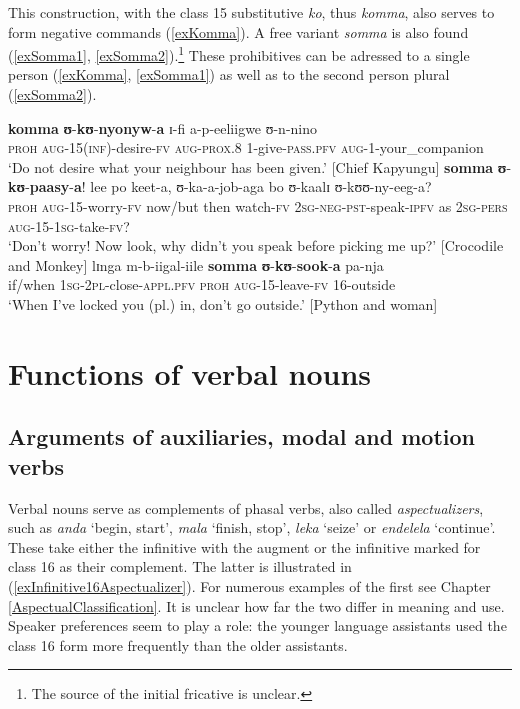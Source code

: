 This construction, with the class 15 substitutive \textit{ko}, thus \textit{komma}, also serves to form negative commands (\ref{exKomma}). A free variant \textit{somma} is also found (\ref{exSomma1}, \ref{exSomma2}).\footnote{The source of the initial fricative is unclear.} These prohibitives can be adressed to a single person (\ref{exKomma}, \ref{exSomma1}) as well as to the second person plural (\ref{exSomma2}).
\begin{exe}
\ex \label{exKomma}\gll \textbf{komma} \textbf{ʊ}-\textbf{kʊ}-\textbf{nyonyw}-\textbf{a} ɪ-fi a-p-eeliigwe ʊ-n-nino\\
\textsc{proh} \textsc{aug}-15(\textsc{inf})-desire-\textsc{fv} \textsc{aug}-\textsc{prox}.8 1-give-\textsc{pass}.\textsc{pfv} \textsc{aug}-1-your\_companion\\
\glt `Do not desire what your neighbour has been given.' [Chief Kapyungu]
\ex \label{exSomma1}
\gll \textbf{somma} \textbf{ʊ}-\textbf{kʊ}-\textbf{paasy}-\textbf{a}! lee po keet-a, ʊ-ka-a-job-aga bo ʊ-kaalɪ ʊ-kʊʊ-ny-eeg-a?\\
\textsc{proh} \textsc{aug}-15-worry-\textsc{fv} now/but then watch-\textsc{fv} \textsc{2sg}-\textsc{neg}-\textsc{pst}-speak-\textsc{ipfv} as \textsc{2sg}-\textsc{pers} \textsc{aug}-15-\textsc{1sg}-take-\textsc{fv}?\\
\glt \lq Don't worry! Now look, why didn't you speak before picking me up?' [Crocodile and Monkey]
\ex \label{exSomma2}
\gll lɪnga m-b-iigal-iile \textbf{somma} \textbf{ʊ}-\textbf{kʊ}-\textbf{sook}-\textbf{a} pa-nja\\
if/when \textsc{1sg}-\textsc{2pl}-close-\textsc{appl.pfv} \textsc{proh} \textsc{aug}-15-leave-\textsc{fv} 16-outside\\
\glt \lq When I've locked you (pl.) in, don't go outside.' [Python and woman]
\end{exe}
\section{Functions of verbal nouns}\label{VerbalNounsFunctions}

\subsection{Arguments of auxiliaries, modal and motion verbs}\label{VerbalNounsArguments}
Verbal nouns serve as complements of phasal verbs, also called \textit{aspectualizers}, such as \textit{anda} `begin, start', \textit{mala} `finish, stop', \textit{leka} `seize' or  \textit{endelela} `continue'. These take either the infinitive with the augment or the infinitive marked for  class 16 as their complement. The latter is illustrated in (\ref{exInfinitive16Aspectualizer}). For numerous examples of the first see Chapter \ref{AspectualClassification}. It is unclear how far the two differ in meaning and use. Speaker preferences seem to play a role: the younger language assistants used the class 16 form more frequently than the older assistants.

